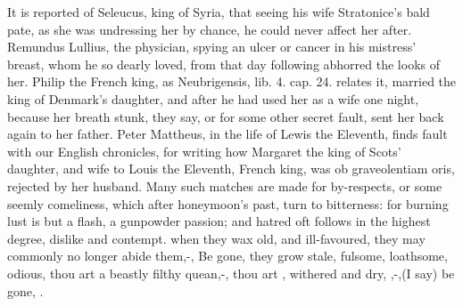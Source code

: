 It is reported of Seleucus, king of Syria, that seeing his wife
Stratonice's bald pate, as she was undressing her by chance, he could
never affect her after. Remundus Lullius, the physician, spying an
ulcer or cancer in his mistress' breast, whom he so dearly loved, from
that day following abhorred the looks of her. Philip the French king,
as Neubrigensis, lib. 4. cap. 24. relates it, married the king of
Denmark's daughter, and after he had used her as a wife one
night, because her breath stunk, they say, or for some other secret
fault, sent her back again to her father. Peter Mattheus, in the life
of Lewis the Eleventh, finds fault with our English chronicles,
for writing how Margaret the king of Scots' daughter, and wife to Louis
the Eleventh, French king, was ob graveolentiam oris, rejected by her
husband. Many such matches are made for by-respects, or some seemly
comeliness, which after honeymoon's past, turn to bitterness: for
burning lust is but a flash, a gunpowder passion; and hatred oft
follows in the highest degree, dislike and contempt.
%
%
when they wax old, and ill-favoured, they may commonly no longer abide
them,-, Be gone, they grow stale, fulsome,
loathsome, odious, thou art a beastly filthy quean,-, thou art , withered and dry, ,-,(I say) be gone, .

